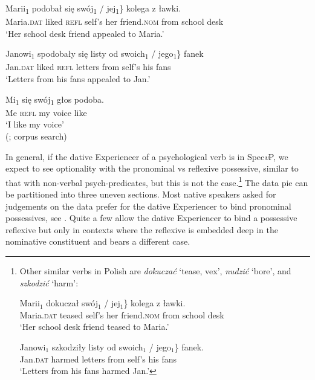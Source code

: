 \documentclass[output=paper,modfonts,nonflat
]{langsci/langscibook}
\begin{document}
\ea \label{ex:witkos:44}
\gll Marii\textsubscript{1} podobał się \minsp{\{*} swój\textsubscript{1} / jej\textsubscript{1}\} kolega z ławki.\\
     Maria.\textsc{dat} liked \textsc{refl} {} self’s {} her friend.\textsc{nom} from school desk\\
\glt `Her school desk friend appealed to Maria.'
\z

\ea \label{ex:witkos:45}
\gll Janowi\textsubscript{1} spodobały się listy od \minsp{\{} swoich\textsubscript{1} / jego\textsubscript{1}\} fanek\\
     Jan.\textsc{dat} liked \textsc{refl} letters from {} self’s {} his fans\\
\glt `Letters from his fans appealed to Jan.'
\z

\ea \label{ex:witkos:46}
\gll Mi\textsubscript{1} się swój\textsubscript{1} głos podoba.\\
     Me \textsc{refl} my voice like\\
\glt `I like my voice' \\ 
\xspace\hfill(\citealt[107, ex. (62)]{miechowicz2008}; corpus search)
\z

\noindent In general, if the dative Experiencer of a psychological verb is in Spec\textit{v}P, we expect to see optionality with the pronominal vs reflexive possessive, similar to that with non-verbal psych-predicates, but this is not the case.\footnote{\label{fn24}Other similar verbs in Polish are \textit{dokuczać} ‘tease, vex’, \textit{nudzić} ‘bore’, and \textit{szkodzić} ‘harm’:

\ea
\gll Marii$_1$ dokuczał \minsp{\{*} swój$_1$ / jej$_1$\} kolega z ławki.\\
Maria.\textsc{dat} teased {} self’s  {} her friend.\textsc{nom} from school desk\\
\glt `Her school desk friend teased to Maria.’
\z

\ea
\gll Janowi$_1$ szkodziły listy od  swoich$_1$ / jego$_1$\} fanek.\\
Jan.\textsc{dat} harmed letters from {} self’s {} his fans\\
\glt `Letters from his fans harmed Jan.’
\z} The data pie can be partitioned into three uneven sections. Most native speakers asked for judgements on the data prefer for the dative Experiencer to bind pronominal possessives, see . Quite a few allow the dative Experiencer to bind a possessive reflexive but only in contexts where the reflexive is embedded deep in the nominative constituent and bears a different case. 
\end{document}
